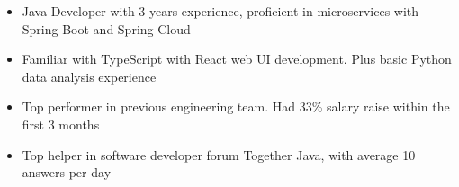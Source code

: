 \begin{itemize}
    \item Java Developer with 3 years experience, proficient in microservices with Spring Boot and Spring Cloud
    \item Familiar with TypeScript with React web UI development. Plus basic Python data analysis experience
    \item Top performer in previous engineering team. Had 33\% salary raise within the first 3 months
    \item Top helper in software developer forum Together Java, with average 10 answers per day
\end{itemize}
